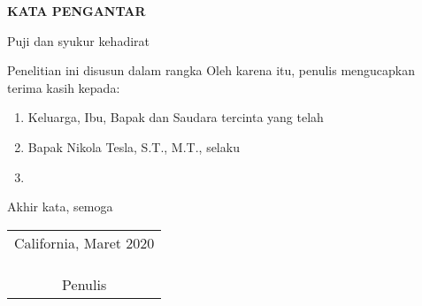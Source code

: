 \begin{center}
  \Large\textbf{KATA PENGANTAR}
\end{center}
\vspace{1ex}


\setlength{\parindent}{7ex}

Puji dan syukur kehadirat \lipsum[1][1-5]
\vspace{0.5ex}

Penelitian ini disusun dalam rangka \lipsum[1][1-5]
Oleh karena itu, penulis mengucapkan terima kasih kepada:
\vspace{0.5ex}

\begin{enumerate}[nolistsep]

  \item Keluarga, Ibu, Bapak dan Saudara tercinta yang telah \lipsum[1][1]
  \vspace{0.5ex}

  \item Bapak Nikola Tesla, S.T., M.T., selaku \lipsum[1][1-2]
  \vspace{0.5ex}

  \item \lipsum[1][1-3]
  \vspace{0.5ex}

\end{enumerate}
\vspace{0.5ex}

Akhir kata, semoga \lipsum[1][1-5]
\vspace{2ex}

\begin{flushright}
  \begin{tabular}[b]{c}
    California, Maret 2020
    \\
    \\
    \\
    \\
    Penulis
  \end{tabular}
\end{flushright}